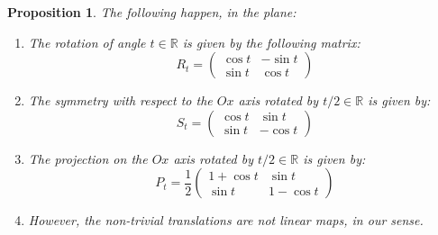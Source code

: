 \documentclass[12pt]{amsbook}
\newtheorem{proposition}[theorem]{Proposition}
\begin{document}

\begin{proposition}
The following happen, in the plane:
\begin{enumerate}
\item The rotation of angle $t\in\mathbb R$ is given by the following matrix:
$$R_t=\begin{pmatrix}\cos t&-\sin t\\ \sin t&\cos t\end{pmatrix}$$

\item The symmetry with respect to the $Ox$ axis rotated by $t/2\in\mathbb R$ is given by:
$$S_t=\begin{pmatrix}\cos t&\sin t\\ \sin t&-\cos t\end{pmatrix}$$

\item The projection on the $Ox$ axis rotated by $t/2\in\mathbb R$ is given by:
$$P_t=\frac{1}{2}\begin{pmatrix}1+\cos t&\sin t\\ \sin t&1-\cos t\end{pmatrix}$$

\item However, the non-trivial translations are not linear maps, in our sense.
\end{enumerate}
\end{proposition}
\end{document}

